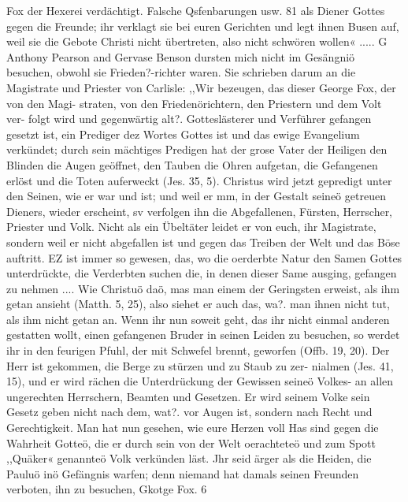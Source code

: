{%
Fox der Hexerei verdächtigt. Falsche Qsfenbarungen usw. 81
als Diener Gottes gegen die Freunde; ihr verklagt sie bei euren
Gerichten und legt ihnen Busen auf, weil sie die Gebote Christi
nicht übertreten, also nicht schwören wollen« ..... G
Anthony Pearson and Gervase Benson dursten mich nicht im
Gesängniö besuchen, obwohl sie Frieden?-richter waren. Sie
schrieben darum an die Magistrate und Priester von Carlisle:
,,Wir bezeugen, das dieser George Fox, der von den Magi-
straten, von den Friedenörichtern, den Priestern und dem Volt ver-
folgt wird und gegenwärtig alt?. Gotteslästerer und Verführer
gefangen gesetzt ist, ein Prediger dez Wortes Gottes ist und das
ewige Evangelium verkündet; durch sein mächtiges Predigen hat
der grose Vater der Heiligen den Blinden die Augen geöffnet,
den Tauben die Ohren aufgetan, die Gefangenen erlöst und die
Toten auferweckt (Jes. 35, 5). Christus wird jetzt gepredigt unter
den Seinen, wie er war und ist; und weil er mm, in der Gestalt
seineö getreuen Dieners, wieder erscheint, sv verfolgen ihn die
Abgefallenen, Fürsten, Herrscher, Priester und Volk. Nicht als
ein Übeltäter leidet er von euch, ihr Magistrate, sondern weil er
nicht abgefallen ist und gegen das Treiben der Welt und das
Böse auftritt. EZ ist immer so gewesen, das, wo die oerderbte
Natur den Samen Gottes unterdrückte, die Verderbten suchen die,
in denen dieser Same ausging, gefangen zu nehmen .... Wie
Christuö daö, mas man einem der Geringsten erweist, als ihm
getan ansieht (Matth. 5, 25), also siehet er auch das, wa?. man
ihnen nicht tut, als ihm nicht getan an. Wenn ihr nun soweit
geht, das ihr nicht einmal anderen gestatten wollt, einen gefangenen
Bruder in seinen Leiden zu besuchen, so werdet ihr in den feurigen
Pfuhl, der mit Schwefel brennt, geworfen (Offb. 19, 20). Der
Herr ist gekommen, die Berge zu stürzen und zu Staub zu zer-
nialmen (Jes. 41, 15), und er wird rächen die Unterdrückung der
Gewissen seineö Volkes- an allen ungerechten Herrschern, Beamten
und Gesetzen. Er wird seinem Volke sein Gesetz geben nicht nach
dem, wat?. vor Augen ist, sondern nach Recht und Gerechtigkeit.
Man hat nun gesehen, wie eure Herzen voll Has sind gegen die
Wahrheit Gotteö, die er durch sein von der Welt oerachteteö und
zum Spott ,,Quäker« genannteö Volk verkünden läst. Jhr seid
ärger als die Heiden, die Pauluö inö Gefängnis warfen; denn
niemand hat damals seinen Freunden verboten, ihn zu besuchen,
Gkotge Fox. 6


}
